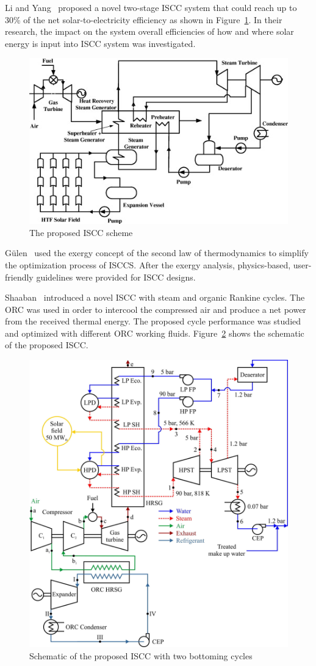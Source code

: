 Li and Yang~\cite{Li2014} proposed a novel two-stage ISCC system that could reach up to 30\% of the net solar-to-electricity efficiency as shown in Figure~\ref{fig:Li2014}. In their research, the impact on the system overall efficiencies of how and where solar energy is input into ISCC system was investigated.
\begin{figure}[!ht]
\centering
\includegraphics[width=.8\textwidth]{fig/Li2014.jpg}
\caption{The proposed ISCC scheme}\label{fig:Li2014}
\end{figure}

G\"{u}len~\cite{Gulen2015} used the exergy concept of the second law of thermodynamics to simplify the optimization process of ISCCS. After the exergy analysis, physics-based, user-friendly guidelines were provided for ISCC designs.

Shaaban~\cite{Shaaban2016} introduced a novel ISCC with steam and organic Rankine cycles. The ORC was used in order to intercool the compressed air and produce a net power from the received thermal energy. The proposed cycle performance was studied and optimized with different ORC working fluids. Figure~\ref{fig:Shaaban2016} shows the schematic of the proposed ISCC.
\begin{figure}[!ht]
\centering
\includegraphics[width=.8\textwidth]{fig/Shaaban2016.jpg}
\caption{Schematic of the proposed ISCC with two bottoming cycles}\label{fig:Shaaban2016}
\end{figure}

